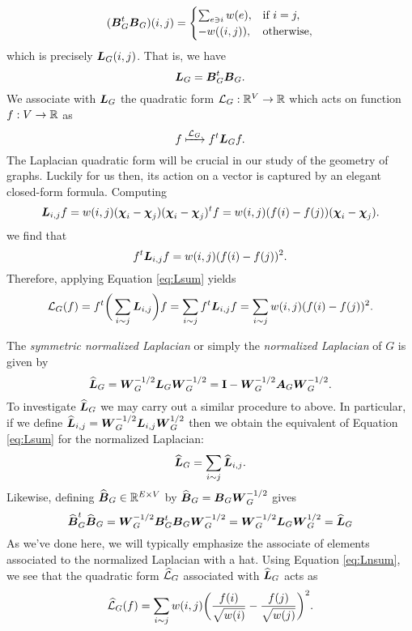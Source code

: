\begin{align*}
(\vb*{B}_G^t\vb*{B}_G)(i,j) = 
\begin{cases}
\sum_{e\ni i} w(e),&\text{if } i=j,\\
-w((i,j)),&\text{otherwise}, 
\end{cases}
\end{align*}
which is precisely $\vb*{L}_G(i,j)$. That is, we have 
 \begin{equation}
 \label{eq:L=BTB}
 \vb*{L}_G=\vb*{B}_G^t\vb*{B}_G.
 \end{equation}
 We associate with $\vb*{L}_G$ the quadratic form $\mathcal{L}_G:\mathbb{R}^V\to \mathbb{R}$ which acts on function $f:V\to \mathbb{R}$ as 
\begin{equation*}
 f\xmapsto{\mathcal{L}_G} f^t \vb*{L}_G f.
\end{equation*}
The Laplacian quadratic form will be crucial in our study of the geometry of graphs. Luckily for us then, its action on a vector is captured by an elegant closed-form formula. 
Computing 
\begin{equation*}
    \vb*{L}_{i,j}f = w(i,j)(\boldsymbol{\chi}_i -\boldsymbol{\chi}_j)(\boldsymbol{\chi}_i-\boldsymbol{\chi}_j)^t f = w(i,j)(f(i)-f(j))(\boldsymbol{\chi}_i-\boldsymbol{\chi}_j).
\end{equation*}
we find that 
\[f^t \vb*{L}_{i,j} f = w(i,j)(f(i)-f(j))^2.\]
Therefore, applying Equation \ref{eq:Lsum} yields 
\begin{equation}
\label{eq:Lop}
    \mathcal{L}_G(f) = f^t \bigg(\sum_{i\sim j} \vb*{L}_{i,j}\bigg) f = \sum_{i\sim j}f^t \vb*{L}_{i,j} f= \sum_{i\sim j} w(i,j)(f(i)-f(j))^2.
\end{equation}

The \emph{symmetric normalized Laplacian} or simply the \emph{normalized Laplacian} of $G$ is given by \begin{equation*}
    \widehat{\vb*{L}}_G = \vb*{W}_G^{-1/2} \vb*{L}_G\vb*{W}_G^{-1/2} = \vb{I} - \vb*{W}_G^{-1/2} \vb*{A}_G\vb*{W}_{G}^{-1/2}.
\end{equation*} 
To investigate $\widehat{\vb*{L}}_G$ we may carry out a similar procedure to above. In particular, if we define $\widehat{\vb*{L}}_{i,j}=\vb*{W}_G^{-1/2} \vb*{L}_{i,j}\vb*{W}_G^{1/2}$ then we obtain the equivalent of Equation \ref{eq:Lsum} for the normalized Laplacian:
\begin{equation}
\label{eq:Lnsum}
    \widehat{\vb*{L}}_G = \sum_{i\sim j}\widehat{\vb*{L}}_{i,j}.
\end{equation}
Likewise, defining $\widehat{\vb*{B}}_G\in \mathbb{R}^{E\times V}$ by $\widehat{\vb*{B}}_G=\vb*{B}_G\vb*{W}_G^{-1/2}$ gives 
\begin{equation*}
   \widehat{\vb*{B}}_G^t \widehat{\vb*{B}}_G = \vb*{W}_G^{-1/2}\vb*{B}_G^t \vb*{B}_G\vb*{W}_G^{-1/2} = \vb*{W}_G^{-1/2}\vb*{L}_G\vb*{W}_G^{1/2}=\widehat{\vb*{L}}_G
\end{equation*}
As we've done here, we will typically emphasize the associate of elements associated to the normalized Laplacian with a hat.
Using Equation \eqref{eq:Lnsum}, we see that 
the quadratic form $\widehat{\mathcal{L}}_G$ associated with $\widehat{\vb*{L}}_G$ acts as 
\begin{equation*}
    \widehat{\mathcal{L}}_G(f) = \sum_{i\sim j} w(i,j)\bigg(\frac{f(i)}{\sqrt{w(i)}}-\frac{f(j)}{\sqrt{w(j)}}\bigg)^2.
\end{equation*}



